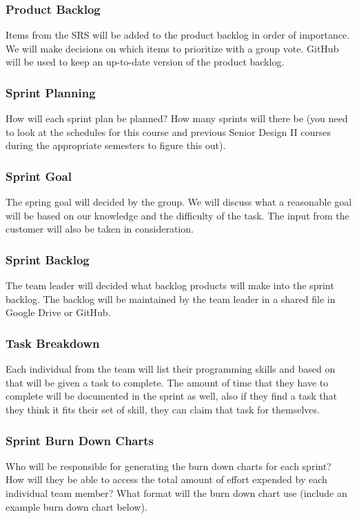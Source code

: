 \subsubsection{Product Backlog}
Items from the SRS will be added to the product backlog in order of importance. We will make decisions on which items to prioritize with a group vote. GitHub will be used to keep an up-to-date version of the product backlog.

\subsubsection{Sprint Planning}
How will each sprint plan be planned? How many sprints will there be (you need to look at the schedules for this course and previous Senior Design II courses during the appropriate semesters to figure this out).

\subsubsection{Sprint Goal}
The spring goal will decided by the group. We will discuss what a reasonable goal will be based on our knowledge and the difficulty of the task. The input from the customer will also be taken in consideration.

\subsubsection{Sprint Backlog}
The team leader will decided what backlog products will make into the sprint backlog. The backlog will be maintained by the team leader in a shared file in Google Drive or GitHub.


\subsubsection{Task Breakdown}
Each individual from the team will list their programming skills and based on that will be given a task to complete. The amount of time that they have to complete will be documented in the sprint as well, also if they find a task that they think it fits their set of skill, they can claim that task for themselves.

\subsubsection{Sprint Burn Down Charts}
Who will be responsible for generating the burn down charts for each sprint? How will they be able to access the total amount of effort expended by each individual team member? What format will the burn down chart use (include an example burn down chart below).

